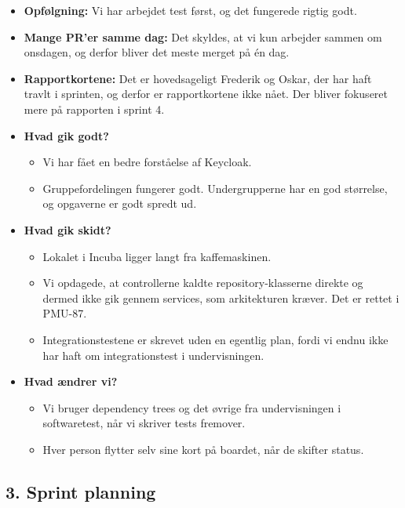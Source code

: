 \documentclass[a4paper,11pt]{article}
\begin{document}
\begin{itemize}
    \item \textbf{Opfølgning:} Vi har arbejdet test først, og det fungerede rigtig godt.
    \item \textbf{Mange PR'er samme dag:} Det skyldes, at vi kun arbejder sammen om onsdagen, og derfor bliver det meste merget på én dag.
    \item \textbf{Rapportkortene:} Det er hovedsageligt Frederik og Oskar, der har haft travlt i sprinten, og derfor er rapportkortene ikke nået. Der bliver fokuseret mere på rapporten i sprint 4.
    \item \textbf{Hvad gik godt?}
    \begin{itemize}
        \item Vi har fået en bedre forståelse af Keycloak.
        \item Gruppefordelingen fungerer godt. Undergrupperne har en god størrelse, og opgaverne er godt spredt ud.
    \end{itemize}
    \item \textbf{Hvad gik skidt?}
    \begin{itemize}
        \item Lokalet i Incuba ligger langt fra kaffemaskinen.
        \item Vi opdagede, at controllerne kaldte repository-klasserne direkte og dermed ikke gik gennem services, som arkitekturen kræver. Det er rettet i PMU-87.
        \item Integrationstestene er skrevet uden en egentlig plan, fordi vi endnu ikke har haft om integrationstest i undervisningen.
    \end{itemize}
    \item \textbf{Hvad ændrer vi?}
    \begin{itemize}
        \item Vi bruger dependency trees og det øvrige fra undervisningen i softwaretest, når vi skriver tests fremover.
        \item Hver person flytter selv sine kort på boardet, når de skifter status.
    \end{itemize}
\end{itemize}

\subsection*{3. Sprint planning}
\end{document}
